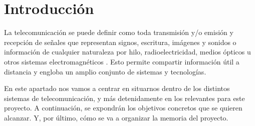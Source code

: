 
\chapter{Introducción}
\label{introduccion}
\par La telecomunicación se puede definir como toda transmisión y/o emisión y recepción de señales que representan signos, escritura, imágenes y sonidos o información de cualquier naturaleza por hilo, radioelectricidad, medios ópticos u otros sistemas electromagnéticos \cite{RAI}. Esto permite compartir información útil a distancia y engloba un amplio conjunto de sistemas y tecnologías. 
\\
\par En este apartado nos vamos a centrar en situarnos dentro de los distintos sistemas de telecomunicación, y más detenidamente en los relevantes para este proyecto. A continuación, se expondrán los objetivos concretos que se quieren alcanzar. Y, por último, cómo se va a organizar la memoria del proyecto. 

